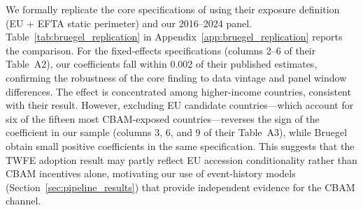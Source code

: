 \documentclass[12pt,a4paper]{article}
\begin{document}
We formally replicate the core specifications of \citet{Bahi2026} using their exposure definition (EU + EFTA static perimeter) and our 2016--2024 panel. Table~\ref{tab:bruegel_replication} in Appendix~\ref{app:bruegel_replication} reports the comparison. For the fixed-effects specifications (columns 2--6 of their Table~A2), our coefficients fall within 0.002 of their published estimates, confirming the robustness of the core finding to data vintage and panel window differences. The effect is concentrated among higher-income countries, consistent with their result. However, excluding EU candidate countries---which account for six of the fifteen most CBAM-exposed countries---reverses the sign of the coefficient in our sample (columns 3, 6, and 9 of their Table~A3), while Bruegel obtain small positive coefficients in the same specification. This suggests that the TWFE adoption result may partly reflect EU accession conditionality rather than CBAM incentives alone, motivating our use of event-history models (Section~\ref{sec:pipeline_results}) that provide independent evidence for the CBAM channel.
\end{document}
